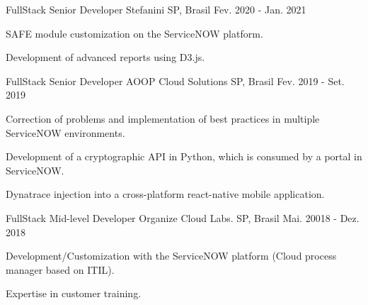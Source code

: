 \begin{cventries}
     \cventry
    {FullStack Senior Developer} %
    {Stefanini} %
    {SP, Brasil} %
    {Fev. 2020 - Jan. 2021} %
    {
    	\begin{cvitems} %
    		\item {SAFE module customization on the ServiceNOW platform.}
    		\item {Development of advanced reports using D3.js.}    		
    	\end{cvitems}
    }
    \cventry
    {FullStack Senior Developer} %
    {AOOP Cloud Solutions} %
    {SP, Brasil} %
    {Fev. 2019 - Set. 2019} %
    {
      \begin{cvitems} %
        \item {Correction of problems and implementation of best practices in multiple ServiceNOW environments.}
        \item {Development of a cryptographic API in Python, which is consumed by a portal in ServiceNOW.}
        \item {Dynatrace injection into a cross-platform react-native mobile application.}
      \end{cvitems}
    }   
	\cventry
	{FullStack Mid-level Developer} %
	{Organize Cloud Labs.} %
	{SP, Brasil} %
	{Mai. 20018 - Dez. 2018} %
	{
		\begin{cvitems} %
			\item {Development/Customization with the ServiceNOW platform (Cloud process manager based on ITIL).}
			\item {Expertise in customer training.}
		\end{cvitems}
	}

\end{cventries}

